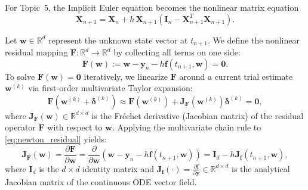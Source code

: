 \documentclass[11pt,a4paper]{article}
\theoremstyle{definition}
\theoremstyle{remark}
\begin{document}
For Topic~5, the Implicit Euler equation becomes the nonlinear matrix
equation
\begin{equation}
\label{eq:topic5_implicit_euler}
\mathbf{X}_{n+1}
=\mathbf{X}_n+h\,\mathbf{X}_{n+1}
\left(\mathbf{I}_n-\mathbf{X}_{n+1}^T\mathbf{X}_{n+1}\right).
\end{equation}

Let $\mathbf{w} \in \mathbb{R}^d$ represent the unknown state vector at $t_{n+1}$. We define the nonlinear residual mapping $\mathbf{F}: \mathbb{R}^d \to \mathbb{R}^d$ by collecting all terms on one side:
\begin{equation}
\label{eq:newton_residual}
\mathbf{F}(\mathbf{w}) := \mathbf{w} - \mathbf{y}_n - h \mathbf{f}(t_{n+1}, \mathbf{w}) = \mathbf{0}.
\end{equation}
To solve $\mathbf{F}(\mathbf{w}) = \mathbf{0}$ iteratively, we linearize $\mathbf{F}$ around a current trial estimate $\mathbf{w}^{(k)}$ via first-order multivariate Taylor expansion:
\begin{equation}
\label{eq:taylor_residual}
\mathbf{F}\left(\mathbf{w}^{(k)} + \boldsymbol{\delta}^{(k)}\right) \approx \mathbf{F}\left(\mathbf{w}^{(k)}\right) + \mathbf{J}_{\mathbf{F}}\left(\mathbf{w}^{(k)}\right) \boldsymbol{\delta}^{(k)} = \mathbf{0},
\end{equation}
where $\mathbf{J}_{\mathbf{F}}(\mathbf{w}) \in \mathbb{R}^{d \times d}$ is the Fr\'echet derivative (Jacobian matrix) of the residual operator $\mathbf{F}$ with respect to $\mathbf{w}$. Applying the multivariate chain rule to \eqref{eq:newton_residual} yields:
\begin{equation}
\label{eq:residual_jacobian}
\mathbf{J}_{\mathbf{F}}(\mathbf{w}) = \frac{\partial \mathbf{F}}{\partial \mathbf{w}} = \frac{\partial}{\partial \mathbf{w}} \left(\mathbf{w} - \mathbf{y}_n - h \mathbf{f}(t_{n+1}, \mathbf{w})\right) = \mathbf{I}_d - h \mathbf{J}_{\mathbf{f}}(t_{n+1}, \mathbf{w}),
\end{equation}
where $\mathbf{I}_d$ is the $d \times d$ identity matrix and $\mathbf{J}_{\mathbf{f}}(\cdot) = \frac{\partial \mathbf{f}}{\partial \mathbf{y}} \in \mathbb{R}^{d \times d}$ is the analytical Jacobian matrix of the continuous ODE vector field.
\end{document}
